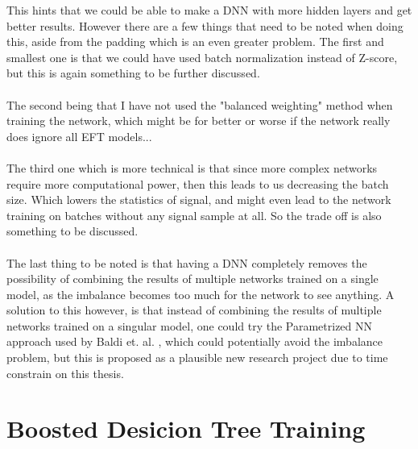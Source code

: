\documentclass[14pt, a4paper]{book}
\begin{document}
\newpage\noindent This hints that we could be able to make a DNN with more hidden layers and get better results. However there are a few things that need to be noted when doing this, aside from the padding which is an even greater problem.
The first and smallest one is that we could have used batch normalization instead of Z-score, but this is again something to be further discussed.\\
\\The second being that I have not used the "balanced weighting" method when training the network, which might be for better or worse if the network really does ignore all EFT models...\\
\\The third one which is more technical is that since more complex networks require more computational power, then this leads to us decreasing the batch size. Which lowers the statistics of signal, 
and might even lead to the network training on batches without any signal sample at all. So the trade off is also something to be discussed.\\
\\The last thing to be noted is that having a DNN completely removes the possibility of combining the results of multiple networks trained on a single model, as the imbalance becomes too much for the network to see anything.
A solution to this however, is that instead of combining the results of multiple networks trained on a singular model, one could try the Parametrized NN approach used by Baldi et. al. \cite{Baldi_2016}, which could potentially avoid the imbalance problem, but this is 
proposed as a plausible new research project due to time constrain on this thesis.
\clearpage
\graphicspath{{../../figures/}}






\section{Boosted Desicion Tree Training}
\end{document}
